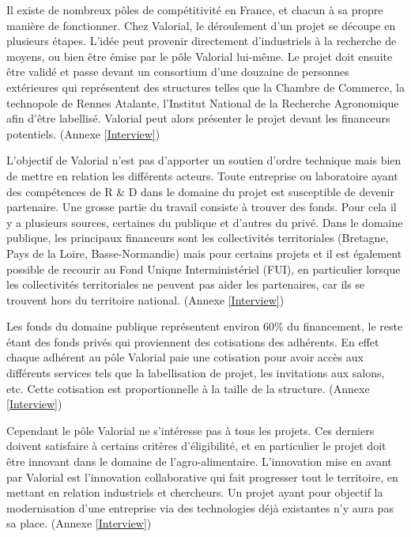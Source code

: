 \documentclass[a4paper,12pt]{report}
\begin{document}
			 Il existe de nombreux pôles de compétitivité en France, et chacun à sa propre manière de fonctionner. Chez Valorial, le déroulement d’un projet se découpe en plusieurs étapes. L’idée peut provenir directement d’industriels à la recherche de moyens, ou bien être émise par le pôle Valorial lui-même. Le projet doit ensuite être validé et passe devant un consortium d’une douzaine de personnes extérieures qui représentent des structures telles que la Chambre de Commerce, la technopole de Rennes Atalante, l’Institut National de la Recherche Agronomique afin d’être labellisé. Valorial peut alors présenter le projet devant les financeurs potentiels. (Annexe \ref{Interview})

			L’objectif de Valorial n’est pas d’apporter un soutien d’ordre technique mais bien de mettre en relation les différents acteurs. Toute entreprise ou laboratoire ayant des compétences de R \& D dans le domaine du projet est susceptible de devenir partenaire. Une grosse partie du travail consiste à trouver des fonds. Pour cela il y a plusieurs sources, certaines du publique et d’autres du privé. Dans le domaine publique, les principaux financeurs sont les collectivités territoriales (Bretagne, Pays de la Loire, Basse-Normandie) mais pour certains projets et il est également possible de recourir au Fond Unique Interministériel (FUI), en particulier lorsque les collectivités territoriales ne peuvent pas aider les partenaires, car ils se trouvent hors du territoire national. (Annexe \ref{Interview})

			Les fonds du domaine publique représentent environ 60\% du financement, le reste étant des fonds privés qui proviennent des cotisations des adhérents. En effet chaque adhérent au pôle Valorial paie une cotisation pour avoir accès aux différents services tels que la labellisation de projet, les invitations aux salons, etc. Cette cotisation est proportionnelle à la taille de la structure. (Annexe \ref{Interview})
    
    			Cependant le pôle Valorial ne s’intéresse pas à tous les projets. Ces derniers doivent satisfaire à certains critères d'éligibilité, et en particulier le projet doit être innovant dans le domaine de l’agro-alimentaire. L’innovation mise en avant par Valorial est l'innovation collaborative qui fait progresser tout le territoire, en mettant en relation industriels et chercheurs. Un projet ayant pour objectif la modernisation d’une entreprise via des technologies déjà existantes n’y aura pas sa place. (Annexe \ref{Interview})
\end{document}
